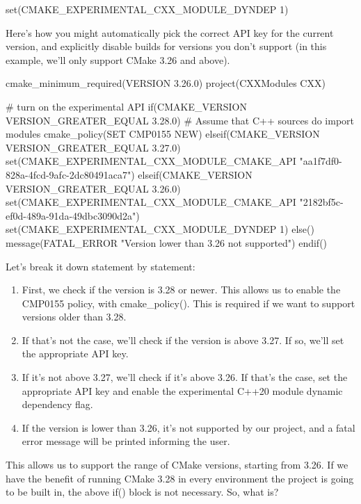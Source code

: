 \begin{cmake}
set(CMAKE_EXPERIMENTAL_CXX_MODULE_DYNDEP 1)
\end{cmake}

Here’s how you might automatically pick the correct API key for the current version, and explicitly disable builds for versions you don’t support (in this example, we’ll only support CMake 3.26 and above).


\begin{cmake}
cmake_minimum_required(VERSION 3.26.0)
project(CXXModules CXX)

# turn on the experimental API
if(CMAKE_VERSION VERSION_GREATER_EQUAL 3.28.0)
    # Assume that C++ sources do import modules
    cmake_policy(SET CMP0155 NEW)
elseif(CMAKE_VERSION VERSION_GREATER_EQUAL 3.27.0)
    set(CMAKE_EXPERIMENTAL_CXX_MODULE_CMAKE_API
        "aa1f7df0-828a-4fcd-9afc-2dc80491aca7")
elseif(CMAKE_VERSION VERSION_GREATER_EQUAL 3.26.0)
    set(CMAKE_EXPERIMENTAL_CXX_MODULE_CMAKE_API
        "2182bf5c-ef0d-489a-91da-49dbc3090d2a")
    set(CMAKE_EXPERIMENTAL_CXX_MODULE_DYNDEP 1)
else()
    message(FATAL_ERROR "Version lower than 3.26 not supported")
endif()
\end{cmake}

Let’s break it down statement by statement:

\begin{enumerate}
\item
First, we check if the version is 3.28 or newer. This allows us to enable the CMP0155 policy, with cmake\_policy(). This is required if we want to support versions older than 3.28.

\item
If that’s not the case, we’ll check if the version is above 3.27. If so, we’ll set the appropriate API key.

\item
If it’s not above 3.27, we’ll check if it’s above 3.26. If that’s the case, set the appropriate API key and enable the experimental C++20 module dynamic dependency flag.

\item
If the version is lower than 3.26, it’s not supported by our project, and a fatal error message will be printed informing the user.
\end{enumerate}

This allows us to support the range of CMake versions, starting from 3.26. If we have the benefit of running CMake 3.28 in every environment the project is going to be built in, the above if() block is not necessary. So, what is?

